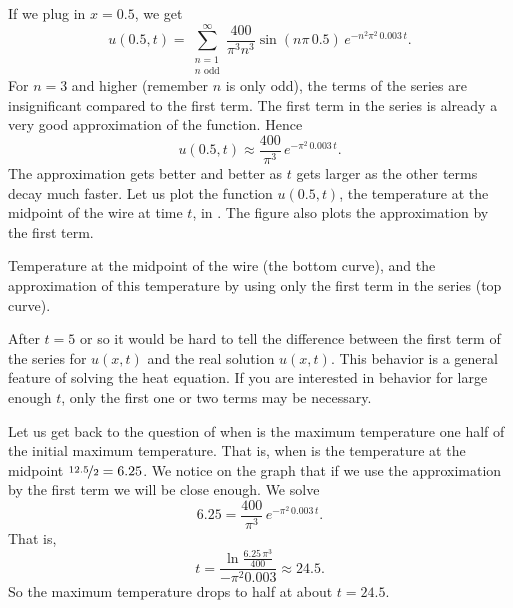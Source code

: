 \begin{example}
If we plug in $x=0.5$, we get
\begin{equation*}
u(0.5,t) = 
\sum_{\substack{n=1 \\ n \text{ odd}}}^\infty
\frac{400}{\pi^3 n^3}
\sin (n \pi\, 0.5 )
\, e^{-n^2 \pi^2 \, 0.003 \, t} .
\end{equation*}
For $n=3$ and higher (remember $n$ is only odd), the terms
of the series
are insignificant compared to the first term.
The first term in the series is already a very good approximation
of the function.  
Hence 
\begin{equation*}
u(0.5,t) \approx
\frac{400}{\pi^3}
\, e^{-\pi^2 \, 0.003 \, t} .
\end{equation*}
The approximation gets better and better as $t$ gets larger as the other
terms decay much faster.
Let us plot the function $u(0.5,t)$, the temperature at the midpoint of the wire
at time $t$, in .  The figure also
plots the approximation by the first term.

\begin{myfig}
\capstart
{}
\caption{Temperature at the midpoint of the wire (the bottom curve),
and the approximation of this temperature by using only the first term in
the series (top curve).\label{heat:wireexmaxfig}}
\end{myfig}

After $t=5$ or so
it would be hard to tell the difference
between the first term of the series for $u(x,t)$ and 
the real solution $u(x,t)$.  This behavior
is a general feature of solving the heat equation.
If you are interested in behavior for large enough $t$, only the
first one or two terms may be necessary.

Let us
get back to the question of when is the maximum temperature one half of the
initial maximum temperature.  That is, when is the temperature
at the midpoint $\nicefrac{12.5}{2} = 6.25$.  We notice on the graph that if we use
the approximation by the first term we will be close enough.  We
solve
\begin{equation*}
6.25 =
\frac{400}{\pi^3}
\, e^{-\pi^2 \, 0.003 \, t} .
\end{equation*}
That is,
\begin{equation*}
t =
\frac{\ln \frac{6.25\,\pi^3}{400}}{-\pi^2 0.003}
\approx 24.5 .
\end{equation*}
So the maximum temperature drops to half at about $t=24.5$.
\end{example}

